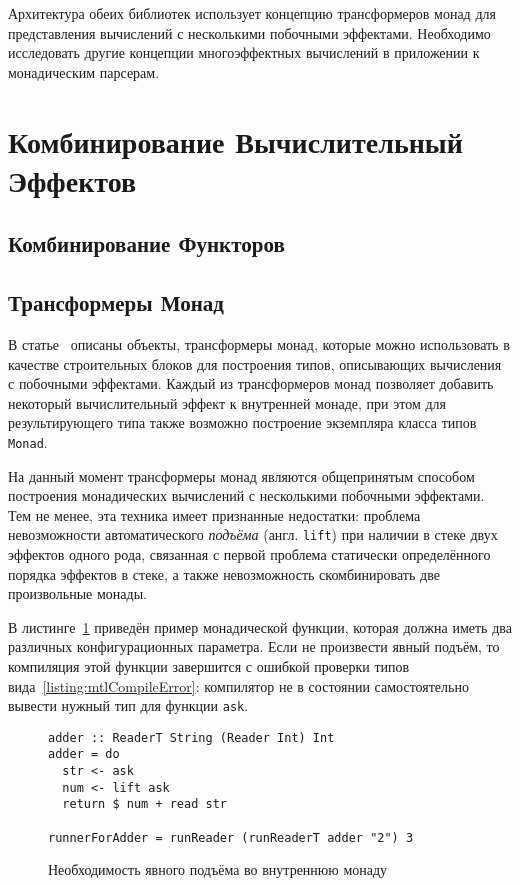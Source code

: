 Архитектура обеих библиотек использует концепцию трансформеров монад для представления вычислений с несколькими побочными эффектами. Необходимо исследовать другие концепции многоэффектных вычислений в приложении к монадическим парсерам.

\section{Комбинирование Вычислительный Эффектов}

\subsection{Комбинирование Функторов}

\subsection{Трансформеры Монад}

В статье~\autocite{MonadTransformers} описаны объекты, трансформеры монад, которые можно использовать в качестве строительных блоков для построения типов, описывающих вычисления с побочными эффектами. Каждый из трансформеров монад позволяет добавить некоторый вычислительный эффект к внутренней монаде, при этом для результирующего типа также возможно построение экземпляра класса типов \lstinline{Monad}.

На данный момент трансформеры монад являются общепринятым способом построения монадических вычислений с несколькими побочными эффектами. Тем не менее, эта техника имеет признанные недостатки: проблема невозможности автоматического \emph{подъёма} (англ. \lstinline{lift}) при наличии в стеке двух эффектов одного рода, связанная с первой проблема статически определённого порядка эффектов в стеке, а также невозможность скомбинировать две произвольные монады.

В листинге~\ref{listing:mtlReadersLift} приведён пример монадической функции, которая должна иметь два различных конфигурационных параметра. Если не произвести явный подъём, то компиляция этой функции завершится с ошибкой проверки типов вида~\ref{listing:mtlCompileError}: компилятор не в состоянии самостоятельно вывести нужный тип для функции \lstinline{ask}.

\begin{figure}[t]
\begin{lstlisting}
adder :: ReaderT String (Reader Int) Int
adder = do
  str <- ask
  num <- lift ask
  return $ num + read str

runnerForAdder = runReader (runReaderT adder "2") 3
\end{lstlisting}
\caption{Необходимость явного подъёма во внутреннюю монаду}
\label{listing:mtlReadersLift}
\end{figure}

